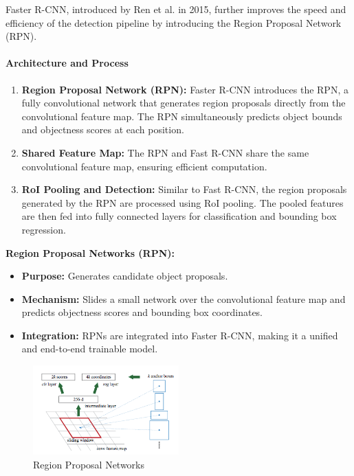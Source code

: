 \documentclass[12pt]{article}
\begin{document}
Faster R-CNN, introduced by Ren et al. in 2015, further improves the speed and efficiency of the detection pipeline by introducing the Region Proposal Network (RPN).

\paragraph{Architecture and Process}

\begin{enumerate}
    \item \textbf{Region Proposal Network (RPN):} Faster R-CNN introduces the RPN, a fully convolutional network that generates region proposals directly from the convolutional feature map. The RPN simultaneously predicts object bounds and objectness scores at each position.

    \item \textbf{Shared Feature Map:} The RPN and Fast R-CNN share the same convolutional feature map, ensuring efficient computation.

    \item \textbf{RoI Pooling and Detection:} Similar to Fast R-CNN, the region proposals generated by the RPN are processed using RoI pooling. The pooled features are then fed into fully connected layers for classification and bounding box regression.
\end{enumerate}

\textbf{Region Proposal Networks (RPN):}
\begin{itemize}
    \item \textbf{Purpose:} Generates candidate object proposals.
    \item \textbf{Mechanism:} Slides a small network over the convolutional feature map and predicts objectness scores and bounding box coordinates.
    \item \textbf{Integration:} RPNs are integrated into Faster R-CNN, making it a unified and end-to-end trainable model.
\end{itemize}

\begin{figure}[h]
    \centering
    \includegraphics[width=0.5\textwidth]{./media/rpn.png}
    \caption{Region Proposal Networks}
    \label{fig:rpn}
\end{figure}
\end{document}
